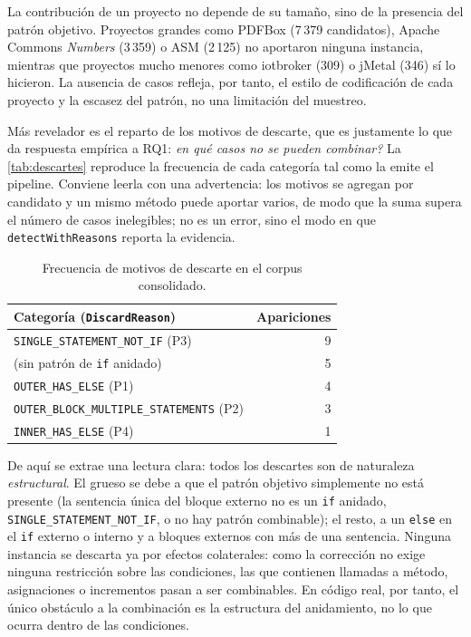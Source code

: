La contribución de un proyecto no depende de su tamaño, sino de la presencia
del patrón objetivo. Proyectos grandes como PDFBox (7\,379 candidatos), Apache
Commons \emph{Numbers} (3\,359) o ASM (2\,125) no aportaron ninguna instancia,
mientras que proyectos mucho menores como iotbroker (309) o jMetal (346) sí lo
hicieron. La ausencia de casos refleja, por tanto, el estilo de codificación de
cada proyecto y la escasez del patrón, no una limitación del muestreo.

Más revelador es el reparto de los motivos de descarte, que es justamente lo
que da respuesta empírica a RQ1: \emph{\textquestiondown{}en qué casos no se
pueden combinar?} La \autoref{tab:descartes}
reproduce la frecuencia de cada categoría tal como la emite el pipeline.
Conviene leerla con una advertencia: los motivos se agregan por candidato y
un mismo método puede aportar varios, de modo que la suma supera el número de
casos inelegibles; no es un error, sino el modo en que
\lstinline|detectWithReasons| reporta la evidencia.

\begin{table}[ht]
\centering
\caption{Frecuencia de motivos de descarte en el corpus consolidado.}
\label{tab:descartes}
\begin{tabular}{@{}lr@{}}
\toprule
\textbf{Categoría (\texttt{DiscardReason})} & \textbf{Apariciones} \\
\midrule
\texttt{SINGLE\_STATEMENT\_NOT\_IF} (P3)         & 9 \\
(sin patrón de \lstinline|if| anidado)           & 5 \\
\texttt{OUTER\_HAS\_ELSE} (P1)                   & 4 \\
\texttt{OUTER\_BLOCK\_MULTIPLE\_STATEMENTS} (P2) & 3 \\
\texttt{INNER\_HAS\_ELSE} (P4)                   & 1 \\
\bottomrule
\end{tabular}
\end{table}

De aquí se extrae una lectura clara: todos los descartes son de naturaleza
\emph{estructural}. El grueso se debe a que el patrón objetivo simplemente no
está presente (la sentencia única del bloque externo no es un \lstinline|if|
anidado, \texttt{SINGLE\_STATEMENT\_NOT\_IF}, o no hay patrón combinable); el
resto, a un \lstinline|else| en el \lstinline|if| externo o interno y a bloques
externos con más de una sentencia. Ninguna instancia se descarta ya por efectos
colaterales: como la corrección no exige ninguna restricción sobre las
condiciones, las que contienen llamadas a método, asignaciones o incrementos
pasan a ser combinables. En código
real, por tanto, el único obstáculo a la combinación es la estructura del
anidamiento, no lo que ocurra dentro de las condiciones.

